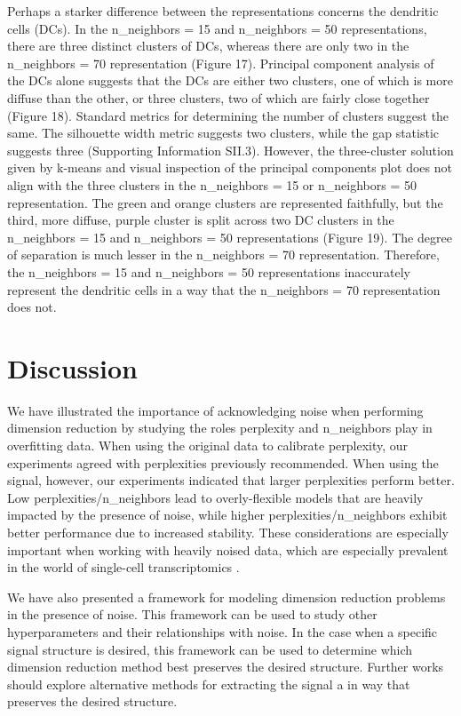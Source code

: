 \documentclass{article}
\begin{document}
Perhaps a starker difference between the representations concerns the dendritic cells (DCs). In the n\_neighbors = 15 and n\_neighbors = 50 representations, there are three distinct clusters of DCs, whereas there are only two in the n\_neighbors = 70 representation (Figure 17). Principal component analysis of the DCs alone suggests that the DCs are either two clusters, one of which is more diffuse than the other, or three clusters, two of which are fairly close together (Figure 18). Standard metrics for determining the number of clusters suggest the same. The silhouette width metric suggests two clusters, while the gap statistic suggests three (Supporting Information SII.3). However, the three-cluster solution given by k-means and visual inspection of the principal components plot does not align with the three clusters in the n\_neighbors = 15 or n\_neighbors = 50 representation. The green and orange clusters are represented faithfully, but the third, more diffuse, purple cluster is split across two DC clusters in the n\_neighbors = 15 and n\_neighbors = 50 representations (Figure 19). The degree of separation is much lesser in the n\_neighbors = 70 representation. Therefore, the n\_neighbors = 15 and n\_neighbors = 50 representations inaccurately represent the dendritic cells in a way that the n\_neighbors = 70 representation does not.

\section{Discussion}
We have illustrated the importance of acknowledging noise when performing dimension reduction by studying the roles perplexity and n\_neighbors play in overfitting data. When using the original data to calibrate perplexity, our experiments agreed with perplexities previously recommended. When using the signal, however, our experiments indicated that larger perplexities perform better. Low perplexities/n\_neighbors lead to overly-flexible models that are heavily impacted by the presence of noise, while higher perplexities/n\_neighbors exhibit better performance due to increased stability. These considerations are especially important when working with heavily noised data, which are especially prevalent in the world of single-cell transcriptomics \cite{noise in single-cell data}.

We have also presented a framework for modeling dimension reduction problems in the presence of noise. This framework can be used to study other hyperparameters and their relationships with noise. In the case when a specific signal structure is desired, this framework can be used to determine which dimension reduction method best preserves the desired structure. Further works should explore alternative methods for extracting the signal a in way that preserves the desired structure.
\end{document}
